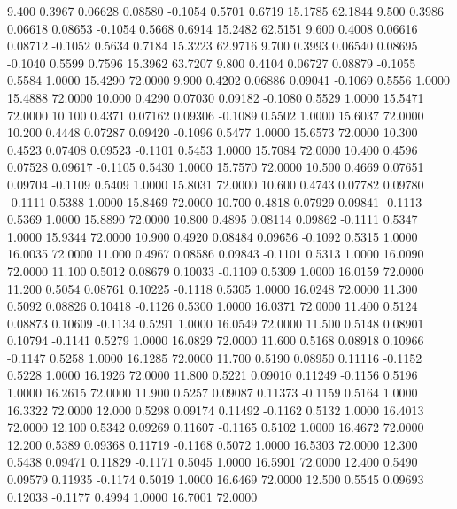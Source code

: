    9.400   0.3967   0.06628   0.08580  -0.1054   0.5701   0.6719  15.1785  62.1844
   9.500   0.3986   0.06618   0.08653  -0.1054   0.5668   0.6914  15.2482  62.5151
   9.600   0.4008   0.06616   0.08712  -0.1052   0.5634   0.7184  15.3223  62.9716
   9.700   0.3993   0.06540   0.08695  -0.1040   0.5599   0.7596  15.3962  63.7207
   9.800   0.4104   0.06727   0.08879  -0.1055   0.5584   1.0000  15.4290  72.0000
   9.900   0.4202   0.06886   0.09041  -0.1069   0.5556   1.0000  15.4888  72.0000
  10.000   0.4290   0.07030   0.09182  -0.1080   0.5529   1.0000  15.5471  72.0000
  10.100   0.4371   0.07162   0.09306  -0.1089   0.5502   1.0000  15.6037  72.0000
  10.200   0.4448   0.07287   0.09420  -0.1096   0.5477   1.0000  15.6573  72.0000
  10.300   0.4523   0.07408   0.09523  -0.1101   0.5453   1.0000  15.7084  72.0000
  10.400   0.4596   0.07528   0.09617  -0.1105   0.5430   1.0000  15.7570  72.0000
  10.500   0.4669   0.07651   0.09704  -0.1109   0.5409   1.0000  15.8031  72.0000
  10.600   0.4743   0.07782   0.09780  -0.1111   0.5388   1.0000  15.8469  72.0000
  10.700   0.4818   0.07929   0.09841  -0.1113   0.5369   1.0000  15.8890  72.0000
  10.800   0.4895   0.08114   0.09862  -0.1111   0.5347   1.0000  15.9344  72.0000
  10.900   0.4920   0.08484   0.09656  -0.1092   0.5315   1.0000  16.0035  72.0000
  11.000   0.4967   0.08586   0.09843  -0.1101   0.5313   1.0000  16.0090  72.0000
  11.100   0.5012   0.08679   0.10033  -0.1109   0.5309   1.0000  16.0159  72.0000
  11.200   0.5054   0.08761   0.10225  -0.1118   0.5305   1.0000  16.0248  72.0000
  11.300   0.5092   0.08826   0.10418  -0.1126   0.5300   1.0000  16.0371  72.0000
  11.400   0.5124   0.08873   0.10609  -0.1134   0.5291   1.0000  16.0549  72.0000
  11.500   0.5148   0.08901   0.10794  -0.1141   0.5279   1.0000  16.0829  72.0000
  11.600   0.5168   0.08918   0.10966  -0.1147   0.5258   1.0000  16.1285  72.0000
  11.700   0.5190   0.08950   0.11116  -0.1152   0.5228   1.0000  16.1926  72.0000
  11.800   0.5221   0.09010   0.11249  -0.1156   0.5196   1.0000  16.2615  72.0000
  11.900   0.5257   0.09087   0.11373  -0.1159   0.5164   1.0000  16.3322  72.0000
  12.000   0.5298   0.09174   0.11492  -0.1162   0.5132   1.0000  16.4013  72.0000
  12.100   0.5342   0.09269   0.11607  -0.1165   0.5102   1.0000  16.4672  72.0000
  12.200   0.5389   0.09368   0.11719  -0.1168   0.5072   1.0000  16.5303  72.0000
  12.300   0.5438   0.09471   0.11829  -0.1171   0.5045   1.0000  16.5901  72.0000
  12.400   0.5490   0.09579   0.11935  -0.1174   0.5019   1.0000  16.6469  72.0000
  12.500   0.5545   0.09693   0.12038  -0.1177   0.4994   1.0000  16.7001  72.0000
